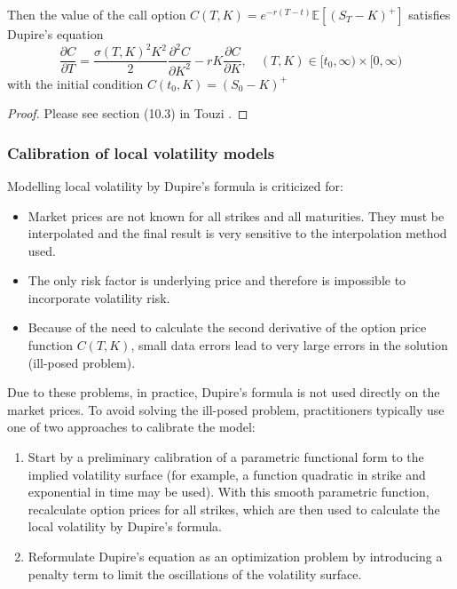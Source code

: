 \documentclass[10pt]{article}
\theoremstyle{plain}
\numberwithin{equation}{section}
\numberwithin{table}{section}
\newcommand{\s}{\sigma}
\newcommand{\pa}{\partial}
\newcommand{\E}{\mathbb{E}}
\begin{document}
Then the value of the call option $C(T, K)=e^{-r(T-t)}\E [(S_T - K)^{+}]$ satisfies Dupire's equation
\[
    \frac{\pa C}{\pa T} = \frac{\s(T,K)^2 K^2}{2} \frac{\pa^2 C}{\pa K^2} - rK\frac{\pa C}{\pa K} ,  \quad (T,K) \in [t_0, \infty) \times [0, \infty) 
\] 
with the initial condition $C(t_0, K) = (S_0 - K)^+$

\begin{proof}
 Please see section (10.3) in Touzi \cite{Touzi}. 
\end{proof}


\subsubsection{Calibration of local volatility models}
Modelling local volatility by Dupire's formula is criticized for: 
\begin{itemize}
    \item Market prices are not known for all strikes and all maturities. They must
    be interpolated and the final result is very sensitive to the interpolation
    method used.
    \item The only risk factor is underlying price and therefore is impossible to incorporate 
    volatility risk.
    \item Because of the need to calculate the second derivative of the option price
    function $C(T, K)$, small data errors lead to very large errors in the solution
    (ill-posed problem).
\end{itemize}

Due to these problems, in practice, Dupire's formula is not used directly
on the market prices. To avoid solving the ill-posed problem, practitioners
typically use one of two approaches to calibrate the model:
\begin{enumerate}
    \item Start by a preliminary calibration of a parametric functional form to the
    implied volatility surface (for example, a function quadratic in strike and
    exponential in time may be used). With this smooth parametric function,
    recalculate option prices for all strikes, which are then used to calculate
    the local volatility by Dupire's formula.
    \item Reformulate Dupire's equation as an optimization problem by introducing
    a penalty term to limit the oscillations of the volatility surface.
\end{enumerate}
\end{document}
